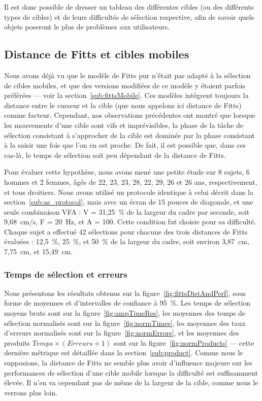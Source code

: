 	Il est donc possible de dresser un tableau des différentes cibles (ou des différents types de cibles) et de leurs difficultés de sélection respective, afin de savoir quels objets poseront le plus de problèmes aux utilisateurs.
	
	\subsection{Distance de Fitts et cibles mobiles}
	\label{sub:fittsDistance}
	Nous avons déjà vu que le modèle de Fitts pur n'était pas adapté à la sélection de cibles mobiles, et que des versions modifiées de ce modèle y étaient parfois préférées --- voir la section~\ref{sub:fittsMobile}. Ces modèles intègrent toujours la distance entre le curseur et la cible (que nous appelons ici distance de Fitts) comme facteur. Cependant, nos observations précédentes ont montré que lorsque les mouvements d'une cible sont vifs et imprévisibles, la phase de la tâche de sélection consistant à s'approcher de la cible est dominée par la phase consistant à la saisir une fois que l'on en est proche. De fait, il est possible que, dans ces cas-là, le temps de sélection soit peu dépendant de la distance de Fitts.
	
	Pour évaluer cette hypothèse, nous avons mené une petite étude sur 8 sujets, 6 hommes et 2 femmes, âgés de 22, 23, 23, 28, 22, 29, 26 et 26 ans, respectivement, et tous droitiers. Nous avons utilisé un protocole identique à celui décrit dans la section~\ref{sub:as_protocol}, mais avec un écran de 15 pouces de diagonale, et une seule combinaison VFA : V = 31,25~\%{} de la largeur du cadre par seconde, soit 9,68~cm/s, F = 20~Hz, et A = 100\textdegree{}. Cette condition fut choisie pour sa difficulté. Chaque sujet a effectué 42 sélections pour chacune des trois distances de Fitts évaluées : 12,5~\%{}, 25~\%{}, et 50~\%{} de la largeur du cadre, soit environ 3,87~cm, 7,75~cm, et 15,49~cm.
	
	\subsubsection{Temps de sélection et erreurs}
	Nous présentons les résultats obtenus sur la figure~\ref{fig:fittsDistAndPerf}, sous forme de moyennes et d'intervalles de confiance à 95~\%{}. Les temps de sélection moyens bruts sont sur la figure~\ref{fig:ampTimeRes}, les moyennes des temps de sélection normalisés sont sur la figure~\ref{fig:normTimes}, les moyennes des taux d'erreurs normalisés sont sur la figure~\ref{fig:normErrors}, et les moyennes des produits $Temps\times(Erreurs+1)$ sont sur la figure~\ref{fig:normProducts} --- cette dernière métrique est détaillée dans la section~\ref{sub:product}. Comme nous le supposions, la distance de Fitts ne semble plus avoir d'influence majeure sur les performances de sélection d'une cible mobile lorsque la difficulté est suffisamment élevée. Il n'en va cependant pas de même de la largeur de la cible, comme nous le verrons plus loin.

